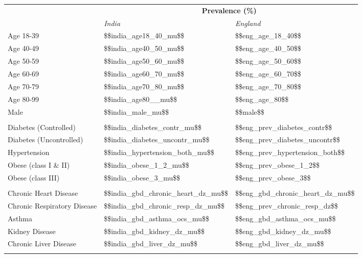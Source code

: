 \begin{tabular}{p{7cm}p{1.1cm}p{1cm}}
& \multicolumn{2}{c}{\textbf{{\footnotesize Prevalence (\%) }}} \\[0.5ex] & \emph{India} & \emph{England} \\[2ex]
Age 18-39 & \num{$$india_age18_40_mu$$} & \num{$$eng_age_18_40$$} \\[0.25ex]
Age 40-49 & \num{$$india_age40_50_mu$$} & \num{$$eng_age_40_50$$} \\[0.25ex]
Age 50-59 & \num{$$india_age50_60_mu$$} & \num{$$eng_age_50_60$$}\\[0.25ex]
Age 60-69 & \num{$$india_age60_70_mu$$} & \num{$$eng_age_60_70$$}\\[0.25ex]
Age 70-79 & \num{$$india_age70_80_mu$$} & \num{$$eng_age_70_80$$}\\[0.25ex]
Age 80-99 & \num{$$india_age80__mu$$} & \num{$$eng_age_80$$} \\[0.25ex]
Male & \num{$$india_male_mu$$} & \num{$$male$$} \\[0.25ex]
\\
Diabetes (Controlled) & \num{$$india_diabetes_contr_mu$$} & \num{$$eng_prev_diabetes_contr$$} \\[0.25ex]
Diabetes (Uncontrolled) & \num{$$india_diabetes_uncontr_mu$$} & \num{$$eng_prev_diabetes_uncontr$$} \\[0.25ex]
Hypertension & \num{$$india_hypertension_both_mu$$} & \num{$$eng_prev_hypertension_both$$} \\[0.25ex]
Obese (class I \& II) & \num{$$india_obese_1_2_mu$$} & \num{$$eng_prev_obese_1_2$$} \\[0.25ex]
Obese (class III) & \num{$$india_obese_3_mu$$} & \num{$$eng_prev_obese_3$$} \\[0.25ex]
\\
Chronic Heart Disease & \num{$$india_gbd_chronic_heart_dz_mu$$} & \num{$$eng_gbd_chronic_heart_dz_mu$$} \\[0.25ex]
Chronic Respiratory Disease & \num{$$india_gbd_chronic_resp_dz_mu$$} & \num{$$eng_prev_chronic_resp_dz$$} \\[0.25ex]
Asthma & \num{$$india_gbd_asthma_ocs_mu$$} & \num{$$eng_gbd_asthma_ocs_mu$$} \\[0.25ex]
Kidney Disease & \num{$$india_gbd_kidney_dz_mu$$} & \num{$$eng_gbd_kidney_dz_mu$$} \\[0.25ex]
Chronic Liver Disease & \num{$$india_gbd_liver_dz_mu$$} & \num{$$eng_gbd_liver_dz_mu$$} \\[0.25ex]
\\

\end{tabular}
